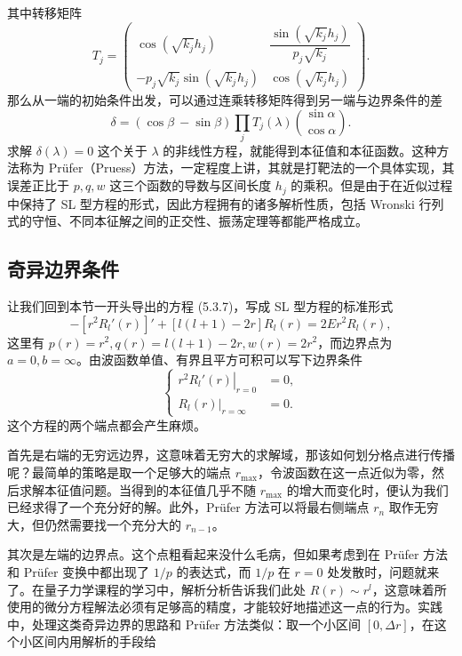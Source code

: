 其中转移矩阵
\begin{equation}
T_j=
\begin{pmatrix}
\cos(\sqrt{k_j}h_j)&\dfrac{\sin(\sqrt{k_j}h_j)}{p_j\sqrt{k_j}}\\[7pt]
-p_j\sqrt{k_j}\sin(\sqrt{k_j}h_j)&\cos(\sqrt{k_j}h_j)
\end{pmatrix}.
\tag{5.3.28}
\end{equation}
那么从一端的初始条件出发，可以通过连乘转移矩阵得到另一端与边界条件的差
\begin{equation}
\delta=(\cos\beta\ -\sin\beta)
\prod_jT_j(\lambda)
\binom{\sin\alpha}{\cos\alpha}.
\tag{5.3.29}
\end{equation}
求解 $\delta(\lambda)=0$ 这个关于 $\lambda$ 的非线性方程，就能得到本征值和本征函数。这种方法称为 Prüfer（Pruess）方法，一定程度上讲，其就是打靶法的一个具体实现，其误差正比于 $p,q,w$ 这三个函数的导数与区间长度 $h_j$ 的乘积。但是由于在近似过程中保持了 SL 型方程的形式，因此方程拥有的诸多解析性质，包括 Wronski 行列式的守恒、不同本征解之间的正交性、振荡定理等都能严格成立。

\subsection{奇异边界条件}

让我们回到本节一开头导出的方程 (5.3.7)，写成 SL 型方程的标准形式
\begin{equation}
-[r^2R_l'(r)]'+[l(l+1)-2r]R_l(r)=2Er^2R_l(r),
\tag{5.3.30}
\end{equation}
这里有 $p(r)=r^2,q(r)=l(l+1)-2r,w(r)=2r^2$，而边界点为 $a=0,b=\infty$。由波函数单值、有界且平方可积可以写下边界条件
\begin{equation}
\left\{
\begin{aligned}
\left.r^2R_l'(r)\right|_{r=0}&=0,\\
\left.R_l(r)\right|_{r=\infty}&=0.
\end{aligned}\right.
\tag{5.3.31}
\end{equation}
这个方程的两个端点都会产生麻烦。

首先是右端的无穷远边界，这意味着无穷大的求解域，那该如何划分格点进行传播呢？最简单的策略是取一个足够大的端点 $r_{\max}$，令波函数在这一点近似为零，然后求解本征值问题。当得到的本征值几乎不随 $r_{\max}$ 的增大而变化时，便认为我们已经求得了一个充分好的解。此外，Prüfer 方法可以将最右侧端点 $r_n$ 取作无穷大，但仍然需要找一个充分大的 $r_{n-1}$。

其次是左端的边界点。这个点粗看起来没什么毛病，但如果考虑到在 Prüfer 方法和 Prüfer 变换中都出现了 $1/p$ 的表达式，而 $1/p$ 在 $r=0$ 处发散时，问题就来了。在量子力学课程的学习中，解析分析告诉我们此处 $R(r)\sim r^l$，这意味着所使用的微分方程解法必须有足够高的精度，才能较好地描述这一点的行为。实践中，处理这类奇异边界的思路和 Prüfer 方法类似：取一个小区间 $[0,\Delta r]$，在这个小区间内用解析的手段给

